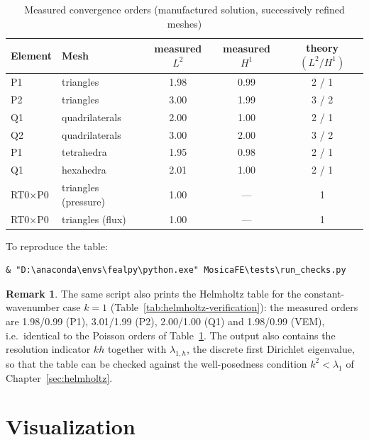 \documentclass[11pt,oneside]{book}
\theoremstyle{definition}
\newtheorem{remark}{Remark}[chapter]
\theoremstyle{plain}
\begin{document}
\begin{table}[htbp]
\centering
\caption{Measured convergence orders (manufactured solution, successively refined meshes)}
\label{tab:verify}
\begin{lrbox}{\guideTableBox}
\begin{tabular}{@{}llccc@{}}
\toprule
Element & Mesh & measured $L^2$ & measured $H^1$ & theory $(L^2/H^1)$ \\
\midrule
P1 & triangles & 1.98 & 0.99 & 2 / 1 \\
P2 & triangles & 3.00 & 1.99 & 3 / 2 \\
Q1 & quadrilaterals & 2.00 & 1.00 & 2 / 1 \\
Q2 & quadrilaterals & 3.00 & 2.00 & 3 / 2 \\
P1 & tetrahedra & 1.95 & 0.98 & 2 / 1 \\
Q1 & hexahedra & 2.01 & 1.00 & 2 / 1 \\
RT0$\times$P0 & triangles (pressure) & 1.00 & --- & 1 \\
RT0$\times$P0 & triangles (flux) & 1.00 & --- & 1 \\
\bottomrule
\end{tabular}
\end{lrbox}%
\ifdim\wd\guideTableBox>\linewidth
  \resizebox{\linewidth}{!}{\usebox{\guideTableBox}}%
\else\usebox{\guideTableBox}\fi
\end{table}

To reproduce the table:

\begin{lstlisting}[style=shell]
& "D:\anaconda\envs\fealpy\python.exe" MosicaFE\tests\run_checks.py
\end{lstlisting}

\begin{remark}
The same script also prints the Helmholtz table for the constant-wavenumber case
$k=1$ (Table~\ref{tab:helmholtz-verification}): the measured orders are 1.98/0.99
(P1), 3.01/1.99 (P2), 2.00/1.00 (Q1) and 1.98/0.99 (VEM), i.e.\ identical to the
Poisson orders of Table~\ref{tab:verify}. The output also contains the resolution
indicator $kh$ together with $\lambda_{1,h}$, the discrete first Dirichlet
eigenvalue, so that the table can be checked against the well-posedness condition
$k^2<\lambda_1$ of Chapter~\ref{sec:helmholtz}.
\end{remark}

\chapter{Visualization}
\label{chap:visual}
\end{document}
